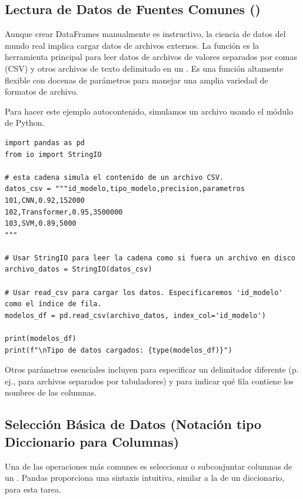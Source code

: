 \subsection{Lectura de Datos de Fuentes Comunes ()}
\label{subsec:pandas_read_csv}
Aunque crear DataFrames manualmente es instructivo, la ciencia de datos del mundo real implica cargar datos de archivos externos. La función  es la herramienta principal para leer datos de archivos de valores separados por comas (CSV) y otros archivos de texto delimitado en un . Es una función altamente flexible con docenas de parámetros para manejar una amplia variedad de formatos de archivo.

\begin{example}
Para hacer este ejemplo autocontenido, simulamos un archivo usando el módulo  de Python.
\text{ }\begin{verbatim}
import pandas as pd
from io import StringIO

# esta cadena simula el contenido de un archivo CSV.
datos_csv = """id_modelo,tipo_modelo,precision,parametros
101,CNN,0.92,152000
102,Transformer,0.95,3500000
103,SVM,0.89,5000
"""

# Usar StringIO para leer la cadena como si fuera un archivo en disco
archivo_datos = StringIO(datos_csv)

# Usar read_csv para cargar los datos. Especificaremos 'id_modelo' como el índice de fila.
modelos_df = pd.read_csv(archivo_datos, index_col='id_modelo')

print(modelos_df)
print(f"\nTipo de datos cargados: {type(modelos_df)}")
\end{verbatim}
Otros parámetros esenciales incluyen  para especificar un delimitador diferente (p. ej.,  para archivos separados por tabuladores) y  para indicar qué fila contiene los nombres de las columnas.
\end{example}

\subsection{Selección Básica de Datos (Notación tipo Diccionario para Columnas)}
\label{subsec:pandas_selection}
Una de las operaciones más comunes es seleccionar o subconjuntar columnas de un . Pandas proporciona una sintaxis intuitiva, similar a la de un diccionario, para esta tarea.

